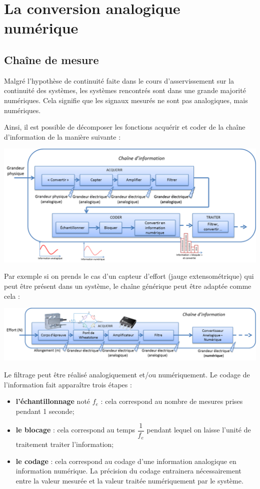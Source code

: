\documentclass[10pt,fleqn]{article} %
\begin{document}


\section{La conversion analogique numérique}
\subsection{Chaîne de mesure}

Malgré l'hypothèse de continuité faite dans le cours d'asservissement sur la continuité des systèmes, les systèmes rencontrés sont dans une grande majorité numériques. Cela signifie que les signaux mesurés ne sont pas analogiques, mais numériques.

Ainsi, il est possible de décomposer les fonctions acquérir et coder de la chaîne d'information de la manière suivante : 
\begin{center}
\includegraphics[width=.8\textwidth]{images/ch_acq}
\end{center}

Par exemple si on prends le cas d'un capteur d'effort (jauge extensométrique) qui peut être présent dans un système, le chaîne générique peut être adaptée comme cela :

\begin{center}
\includegraphics[width=\textwidth]{images/capteur_effort}
\end{center}

Le filtrage peut être réalisé analogiquement et/ou numériquement. Le codage de l'information fait apparaître trois  étapes : 
\begin{itemize}
\item \textbf{l'échantillonnage} noté $f_e$ : cela correspond au nombre de mesures prises pendant 1 seconde;
\item \textbf{le blocage} : cela correspond au temps $\dfrac{1}{f_e}$ pendant lequel on laisse l'unité de traitement traiter l'information; 
\item \textbf{le codage} : cela correspond au codage d'une information analogique en information numérique. La précision du codage entrainera nécessairement entre la valeur mesurée et la valeur traitée numériquement par le système.
\end{itemize}
\end{document}
